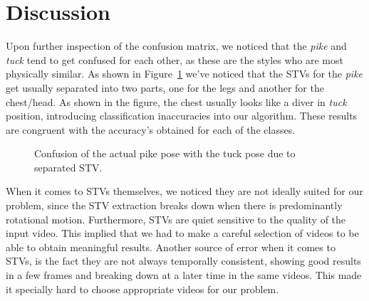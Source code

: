 \documentclass[a4paper, textwidth=18cm, textheight=24cm, top=1cm, bottom=1cm, left=1cm, right=1cm10pt]{article}
\begin{document}
\section{Discussion}

Upon further inspection of the confusion matrix, we noticed that the \emph{pike} and \emph{tuck} tend to get confused for each other, as these are the styles who are most physically similar. As shown in Figure~\ref{fig:pike_as_tuck} we've noticed that the STVs for the \emph{pike} get usually separated into two parts, one for the legs and another for the chest/head. As shown in the figure, the chest usually looks like a diver in \emph{tuck} position, introducing classification inaccuracies into our algorithm. These results are congruent with the accuracy's obtained for each of the classes.

\begin{figure}[!htb]
\caption{\label{fig:pike_as_tuck} Confusion of the actual pike pose with the tuck pose due to separated STV.}
\end{figure}

When it comes to STVs themselves, we noticed they are not ideally suited for our problem, since the STV extraction breaks down when there is predominantly rotational motion. Furthermore, STVs are quiet sensitive to the quality of the input video. This implied that we had to make a careful selection of videos to be able to obtain meaningful results. Another source of error when it comes to STVs, is the fact they are not always temporally consistent, showing good results in a few frames and breaking down at a later time in the same videos. This made it specially hard to choose appropriate videos for our problem.
\end{document}
